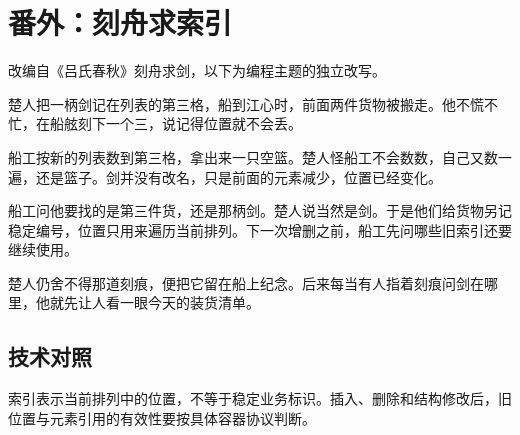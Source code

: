 \section{番外：刻舟求索引}

改编自《吕氏春秋》刻舟求剑，以下为编程主题的独立改写。

楚人把一柄剑记在列表的第三格，船到江心时，前面两件货物被搬走。他不慌不忙，在船舷刻下一个三，说记得位置就不会丢。

船工按新的列表数到第三格，拿出来一只空篮。楚人怪船工不会数数，自己又数一遍，还是篮子。剑并没有改名，只是前面的元素减少，位置已经变化。

船工问他要找的是第三件货，还是那柄剑。楚人说当然是剑。于是他们给货物另记稳定编号，位置只用来遍历当前排列。下一次增删之前，船工先问哪些旧索引还要继续使用。

楚人仍舍不得那道刻痕，便把它留在船上纪念。后来每当有人指着刻痕问剑在哪里，他就先让人看一眼今天的装货清单。

\subsection*{技术对照}

索引表示当前排列中的位置，不等于稳定业务标识。插入、删除和结构修改后，旧位置与元素引用的有效性要按具体容器协议判断。
